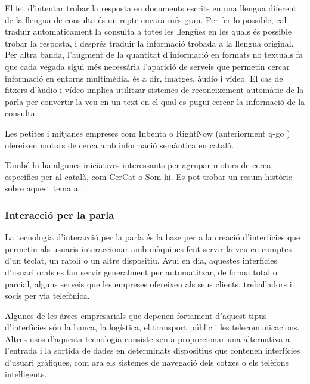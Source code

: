 \begin{multicols}{2}
El fet d’intentar trobar la resposta en documents escrits en una llengua diferent de la llengua de consulta és un repte encara més gran. Per fer-lo possible, cal traduir automàticament la consulta a totes les llengües en les quals és possible trobar la resposta, i després traduir la informació trobada a la llengua original. Per altra banda, l’augment de la quantitat d’informació en formats no textuals fa que cada vegada sigui més necessària l’aparició de serveis que permetin cercar informació en entorns multimèdia, és a dir, imatges, àudio i vídeo. El cas de fitxers d’àudio i vídeo implica utilitzar sistemes de reconeixement automàtic de la parla per convertir la veu en un text en el qual es pugui cercar la informació de la consulta. 

Les petites i mitjanes empreses com Inbenta \cite{CAT-inbenta} o RightNow  (anteriorment q-go \cite{CAT-rightnow}) ofereixen motors de cerca amb informació semàntica en català.


També hi ha algunes iniciatives interessants per agrupar motors de cerca específics per al català, com CerCat o Som-hi\cite{CAT-cercadors}. Es pot trobar un resum històric sobre aquest tema a \cite{CAT-Resum-sobre-cercadors}.
  
\subsubsection{Interacció per la parla}

La tecnologia d’interacció per la parla és la base per a la creació d’interfícies que permetin als usuaris interaccionar amb màquines fent servir la veu en comptes d’un teclat, un ratolí o un altre dispositiu. Avui en dia, aquestes interfícies d’usuari orals es fan servir generalment per automatitzar, de forma total o parcial, alguns serveis que les empreses ofereixen als seus clients, treballadors i socis per via telefònica.

Algunes de les àrees empresarials que depenen fortament d’aquest tipus d’interfícies són la banca, la logística, el transport públic i les telecomunicacions. Altres usos d’aquesta tecnologia consisteixen a proporcionar una alternativa a l’entrada i la sortida de dades en determinats dispositius que contenen interfícies d’usuari gràfiques, com ara els sistemes de navegació dels cotxes o els telèfons inteŀligents. 


\end{multicols}
